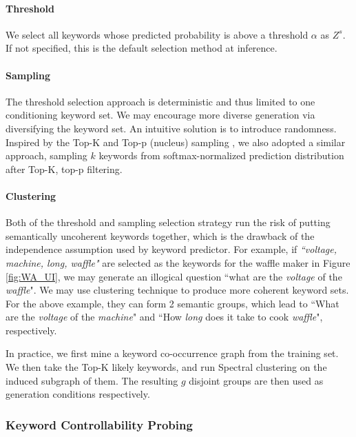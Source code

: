 \paragraph{Threshold} We select all keywords whose predicted probability is above a threshold $\alpha$ as $Z^s$. If not specified, this is the default selection method at inference.

\paragraph{Sampling} The threshold selection approach is deterministic and thus limited to one conditioning keyword set. We may encourage more diverse generation via diversifying the keyword set. An intuitive solution is to introduce randomness. Inspired by the Top-K \citep{fan-etal-2018-hierarchical, radford2019language} and Top-p (nucleus) sampling \citep{holtzman2019curious}, we also adopted a similar approach, sampling $k$ keywords from softmax-normalized prediction distribution after Top-K, top-p filtering.

\paragraph{Clustering} Both of the threshold and sampling selection strategy run the risk of putting semantically uncoherent keywords together, which is the drawback of the independence assumption used by keyword predictor. For example, if \textit{``voltage, machine, long, waffle"} are selected as the keywords for the waffle maker in Figure \ref{fig:WA_UI}, we may generate an illogical question ``what are the \textit{voltage} of the \textit{waffle}". We may use clustering technique to produce more coherent keyword sets. For the above example, they can form 2 semantic groups, which lead to ``What are the \textit{voltage} of the \textit{machine}" and ``How \textit{long} does it take to cook \textit{waffle}", respectively. 

In practice, we first mine a keyword co-occurrence graph from the training set. We then take the Top-K likely keywords, and run Spectral clustering \citep{Shi00normalizedcuts} on the induced subgraph of them. The resulting $g$ disjoint groups are then used as generation conditions respectively.

\subsubsection{Keyword Controllability Probing}

